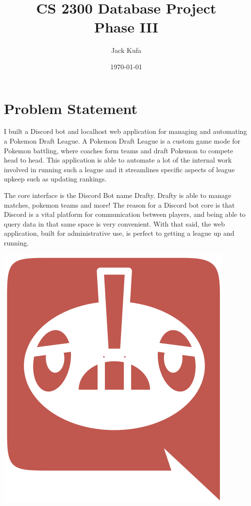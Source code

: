 \documentclass{article}
\title{CS 2300 Database Project \\ Phase III}
\author{Jack Kufa}
\date{\today}
\begin{document}
\maketitle

\section*{Problem Statement}
I built a Discord bot and localhost web application for managing and automating a Pokemon Draft League. A Pokemon Draft League is a custom game mode
for Pokemon battling, where coaches form teams and draft Pokemon to compete head to head. This application is able to automate 
a lot of the internal work involved in running such a league and it streamlines specific aspects of league upkeep such as updating rankings.

The core interface is the Discord Bot name Drafty. Drafty is able to manage matches, pokemon teams and more!
The reason for a Discord bot core is that Discord is a vital platform for communication between players, and being able to query data in that same space is very convenient. 
With that said, the web application, built for administrative use, is perfect to getting a league up and running.\\
\begin{center}
  \includegraphics[scale=.4]{drafty.png}
\end{center}
\end{document}
